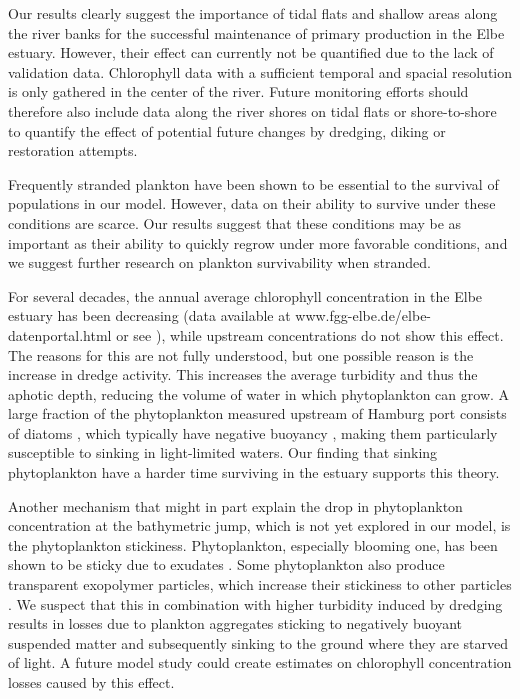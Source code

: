 \documentclass[npg, manuscript]{copernicus}
\begin{document}
Our results clearly suggest the importance of tidal flats and shallow areas along the river banks for the successful maintenance of primary production in the Elbe estuary. 
However, their effect can currently not be quantified due to the lack of validation data.
Chlorophyll data with a sufficient temporal and spacial resolution is only gathered in the center of the river.
Future monitoring efforts should therefore also include data along the river shores on tidal flats or shore-to-shore to quantify the effect of potential future changes by dredging, diking or restoration attempts.

Frequently stranded plankton have been shown to be essential to the survival of populations in our model.
However, data on their ability to survive under these conditions are scarce.
Our results suggest that these conditions may be as important as their ability to quickly regrow under more favorable conditions, and we suggest further research on plankton survivability when stranded.

For several decades, the annual average chlorophyll concentration in the Elbe estuary has been decreasing (data available at www.fgg-elbe.de/elbe-datenportal.html or see \citep{Hardenbicker2014,Schol2014}), while upstream concentrations do not show this effect.
The reasons for this are not fully understood, but one possible reason is the increase in dredge activity.
This increases the average turbidity and thus the aphotic depth, reducing the volume of water in which phytoplankton can grow.
A large fraction of the phytoplankton measured upstream of Hamburg port consists of diatoms \citep{Muylaert1999}, which typically have negative buoyancy \citep{Passow1991}, making them particularly susceptible to sinking in light-limited waters.
Our finding that sinking phytoplankton have a harder time surviving in the estuary supports this theory.

Another mechanism that might in part explain the drop in phytoplankton concentration at the bathymetric jump, which is not yet explored in our model, is the phytoplankton stickiness.
Phytoplankton, especially blooming one, has been shown to be sticky due to exudates \citep{Kiørboe1993,VanderLee2000,Dutz2005}. 
Some phytoplankton also produce transparent exopolymer particles, which increase their stickiness to other particles \citep{Windler,DeBrouwer2005}.
We suspect that this in combination with  higher turbidity induced by dredging results in losses due to plankton aggregates sticking to negatively buoyant suspended matter and subsequently sinking to the ground where they are starved of light.
A future model study could create estimates on chlorophyll concentration losses caused by this effect.
\end{document}

